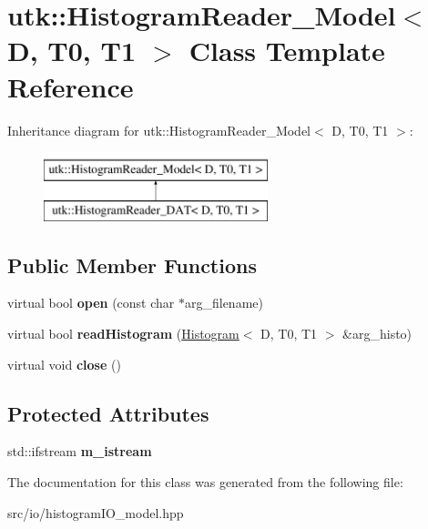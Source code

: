 \hypertarget{classutk_1_1HistogramReader__Model}{\section{utk\-:\-:Histogram\-Reader\-\_\-\-Model$<$ D, T0, T1 $>$ Class Template Reference}
\label{classutk_1_1HistogramReader__Model}
}
Inheritance diagram for utk\-:\-:Histogram\-Reader\-\_\-\-Model$<$ D, T0, T1 $>$\-:\begin{figure}[H]
\begin{center}
\leavevmode
\includegraphics[height=2.000000cm]{classutk_1_1HistogramReader__Model}
\end{center}
\end{figure}
\subsection*{Public Member Functions}
\begin{DoxyCompactItemize}
\item 
\hypertarget{classutk_1_1HistogramReader__Model_a39cb32ec04270965415a934c2ea8d51f}{virtual bool {\bfseries open} (const char $\ast$arg\-\_\-filename)}\label{classutk_1_1HistogramReader__Model_a39cb32ec04270965415a934c2ea8d51f}

\item 
\hypertarget{classutk_1_1HistogramReader__Model_a3957b8d462cadc09bbb24f5605f7a89c}{virtual bool {\bfseries read\-Histogram} (\hyperlink{classutk_1_1Histogram}{Histogram}$<$ D, T0, T1 $>$ \&arg\-\_\-histo)}\label{classutk_1_1HistogramReader__Model_a3957b8d462cadc09bbb24f5605f7a89c}

\item 
\hypertarget{classutk_1_1HistogramReader__Model_aa31c559a5860fd1e04af46e916c8306d}{virtual void {\bfseries close} ()}\label{classutk_1_1HistogramReader__Model_aa31c559a5860fd1e04af46e916c8306d}

\end{DoxyCompactItemize}
\subsection*{Protected Attributes}
\begin{DoxyCompactItemize}
\item 
\hypertarget{classutk_1_1HistogramReader__Model_a417f00ba21cbc73a0790ad0c3b27d02e}{std\-::ifstream {\bfseries m\-\_\-istream}}\label{classutk_1_1HistogramReader__Model_a417f00ba21cbc73a0790ad0c3b27d02e}

\end{DoxyCompactItemize}


The documentation for this class was generated from the following file\-:\begin{DoxyCompactItemize}
\item 
src/io/histogram\-I\-O\-\_\-model.\-hpp\end{DoxyCompactItemize}
